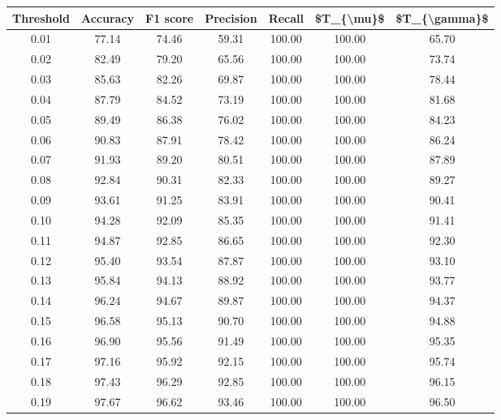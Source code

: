 \begin{tabular}{|c|c|c|c|c|c|c|}
\hline
 Threshold &  Accuracy &  F1 score &  Precision &  Recall &  \$T\_\{\textbackslash mu\}\$ &  \$T\_\{\textbackslash gamma\}\$ \\
\hline
      0.01 &     77.14 &     74.46 &      59.31 &  100.00 &     100.00 &         65.70 \\
      0.02 &     82.49 &     79.20 &      65.56 &  100.00 &     100.00 &         73.74 \\
      0.03 &     85.63 &     82.26 &      69.87 &  100.00 &     100.00 &         78.44 \\
      0.04 &     87.79 &     84.52 &      73.19 &  100.00 &     100.00 &         81.68 \\
      0.05 &     89.49 &     86.38 &      76.02 &  100.00 &     100.00 &         84.23 \\
      0.06 &     90.83 &     87.91 &      78.42 &  100.00 &     100.00 &         86.24 \\
      0.07 &     91.93 &     89.20 &      80.51 &  100.00 &     100.00 &         87.89 \\
      0.08 &     92.84 &     90.31 &      82.33 &  100.00 &     100.00 &         89.27 \\
      0.09 &     93.61 &     91.25 &      83.91 &  100.00 &     100.00 &         90.41 \\
      0.10 &     94.28 &     92.09 &      85.35 &  100.00 &     100.00 &         91.41 \\
      0.11 &     94.87 &     92.85 &      86.65 &  100.00 &     100.00 &         92.30 \\
      0.12 &     95.40 &     93.54 &      87.87 &  100.00 &     100.00 &         93.10 \\
      0.13 &     95.84 &     94.13 &      88.92 &  100.00 &     100.00 &         93.77 \\
      0.14 &     96.24 &     94.67 &      89.87 &  100.00 &     100.00 &         94.37 \\
      0.15 &     96.58 &     95.13 &      90.70 &  100.00 &     100.00 &         94.88 \\
      0.16 &     96.90 &     95.56 &      91.49 &  100.00 &     100.00 &         95.35 \\
      0.17 &     97.16 &     95.92 &      92.15 &  100.00 &     100.00 &         95.74 \\
      0.18 &     97.43 &     96.29 &      92.85 &  100.00 &     100.00 &         96.15 \\
      0.19 &     97.67 &     96.62 &      93.46 &  100.00 &     100.00 &         96.50 \\

\end{tabular}
